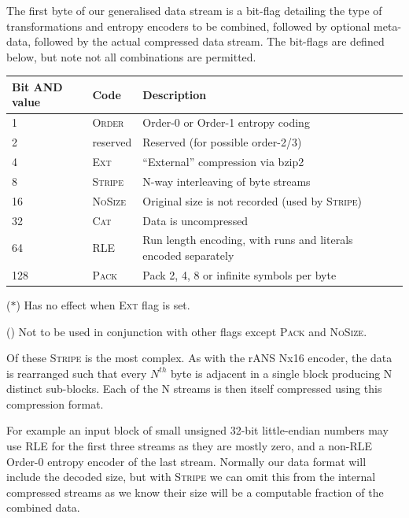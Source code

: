 \documentclass[a4paper]{article}
\begin{document}
The first byte of our generalised data stream is a bit-flag detailing the type of transformations and entropy encoders to be combined, followed by optional meta-data, followed by the actual compressed data stream.
The bit-flags are defined below, but note not all combinations are permitted.

\begin{threeparttable}[t]
\begin{tabular}{llll}
\hline
\textbf{Bit AND value} & \textbf{Code} & \textbf{Description} \\
\hline
1 & \textsc{Order}\tnote{\textbf{$*$}} & Order-0 or Order-1 entropy coding\\
2 & reserved & Reserved (for possible order-2/3)\\
4 & \textsc{Ext} & ``External'' compression via bzip2\\
8 & \textsc{Stripe}\tnote{\textbf{\dag}} & N-way interleaving of byte streams\\
16 & \textsc{NoSize} & Original size is not recorded (used by \textsc{Stripe})\\
32 & \textsc{Cat}\tnote{\textbf{\dag}} & Data is uncompressed\\
64 & \textsc{RLE}\tnote{\textbf{$*$}} & Run length encoding, with runs and literals encoded separately\\
128 & \textsc{Pack} & Pack 2, 4, 8 or infinite symbols per byte\\
\hline
\end{tabular}
\begin{tablenotes}
\item{\footnotesize{($*$)}} \footnotesize{Has no effect when \textsc{Ext} flag is set.}
\item{\footnotesize{(\dag)}} \footnotesize{Not to be used in conjunction with other flags except \textsc{Pack} and \textsc{NoSize}.}
\end{tablenotes}
\end{threeparttable}

Of these \textsc{Stripe} is the most complex.
As with the rANS Nx16 encoder, the data is rearranged such that every
$N^{th}$ byte is adjacent in a single block producing N distinct sub-blocks.
Each of the N streams is then itself compressed using this compression format.

For example an input block of small unsigned 32-bit little-endian numbers may use RLE for the first three streams as they are mostly zero, and a non-RLE Order-0 entropy encoder of the last stream.
Normally our data format will include the decoded size, but with \textsc{Stripe} we can omit this from the internal compressed streams as we know their size will be a computable fraction of the combined data.
\end{document}
